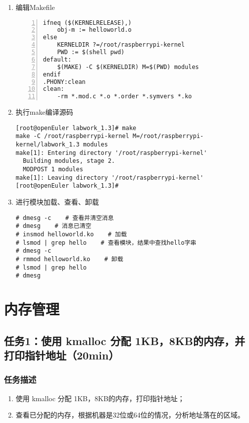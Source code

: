 \documentclass{article}
\begin{document}
\begin{enumerate}
\begin{lstlisting}[numbers=left]
int __init hello_init(void) {
	printk("hello init\n");
	printk("hello,world!\n");
	return 0;
}
void __exit hello_exit(void) {
	printk("hello exit\n");
}
module_init(hello_init);
module_exit(hello_exit);
\end{lstlisting}
	\item 编辑Makefile
	      \begin{lstlisting}[numbers=left]
ifneq ($(KERNELRELEASE),)
	obj-m := helloworld.o
else
	KERNELDIR ?=/root/raspberrypi-kernel
	PWD := $(shell pwd)
default:
	$(MAKE) -C $(KERNELDIR) M=$(PWD) modules
endif
.PHONY:clean
clean:
	-rm *.mod.c *.o *.order *.symvers *.ko
\end{lstlisting}
	\item 执行make编译源码
	      \begin{lstlisting}
[root@openEuler labwork_1.3]# make
make -C /root/raspberrypi-kernel M=/root/raspberrypi-
kernel/labwork_1.3 modules
make[1]: Entering directory '/root/raspberrypi-kernel'
  Building modules, stage 2.
  MODPOST 1 modules
make[1]: Leaving directory '/root/raspberrypi-kernel'
[root@openEuler labwork_1.3]#
\end{lstlisting}
	\item 进行模块加载、查看、卸载
	      \begin{lstlisting}
# dmesg -c    # 查看并清空消息
# dmesg    # 消息已清空
# insmod helloworld.ko    # 加载
# lsmod | grep hello    # 查看模块，结果中查找hello字串
# dmesg -c
# rmmod helloworld.ko    # 卸载
# lsmod | grep hello
# dmesg
\end{lstlisting}
\end{enumerate}

\newpage
\section{内存管理}
\subsection{任务1：使用 kmalloc 分配 1KB，8KB的内存，并打印指针地址（20min）}
\subsubsection{任务描述}
\begin{enumerate}
	\item 使用 kmalloc 分配 1KB，8KB的内存，打印指针地址；
	\item 查看已分配的内存，根据机器是32位或64位的情况，分析地址落在的区域。
\end{enumerate}
\end{document}
